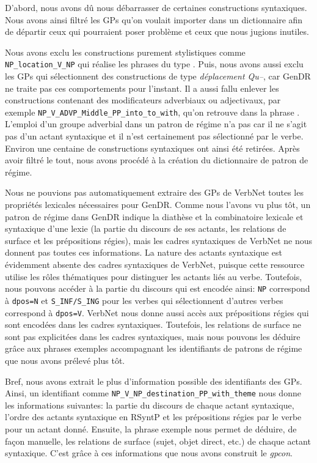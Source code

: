 D'abord, nous avons dû nous débarrasser de certaines constructions syntaxiques. Nous avons ainsi filtré les \acp{GP} qu'on voulait importer dans un dictionnaire afin de départir ceux qui pourraient poser problème et ceux que nous jugions inutiles.

Nous avons exclu les constructions purement stylistiques comme \lstinline|NP_location_V_NP| qui réalise les phrases du type . Puis, nous avons aussi exclu les \acp{GP} qui sélectionnent des constructions de type \emph{déplacement Qu--}, car GenDR ne traite pas ces comportements pour l'instant. Il a aussi fallu enlever les constructions contenant des modificateurs adverbiaux ou adjectivaux, par exemple \lstinline|NP_V_ADVP_Middle_PP_into_to_with|, qu'on retrouve dans la phrase . L'emploi d'un groupe adverbial dans un patron de régime n'a pas car il ne s'agit pas d'un actant syntaxique et il n'est certainement pas sélectionné par le verbe. Environ une centaine de constructions syntaxiques ont ainsi été retirées. Après avoir filtré le tout, nous avons procédé à la création du dictionnaire de patron de régime.

Nous ne pouvions pas automatiquement extraire des \acp{GP} de VerbNet toutes les propriétés lexicales nécessaires pour GenDR. Comme nous l'avons vu plus tôt, un patron de régime dans GenDR indique la diathèse et la combinatoire lexicale et syntaxique d'une lexie (la partie du discours de ses actants, les relations de surface et les prépositions régies), mais les cadres syntaxiques de VerbNet ne nous donnent pas toutes ces informations. La nature des actants syntaxique est évidemment absente des cadres syntaxiques de VerbNet, puisque cette ressource utilise les rôles thématiques pour distinguer les actants liés au verbe. Toutefois, nous pouvons accéder à la partie du discours qui est encodée ainsi: \texttt{NP} correspond à \texttt{dpos=N} et \texttt{S\_INF/S\_ING} pour les verbes qui sélectionnent d'autres verbes correspond à \texttt{dpos=V}. VerbNet nous donne aussi accès aux prépositions régies qui sont encodées dans les cadres syntaxiques. Toutefois, les relations de surface ne sont pas explicitées dans les cadres syntaxiques, mais nous pouvons les déduire grâce aux phrases exemples accompagnant les identifiants de patrons de régime que nous avons prélevé plus tôt.

Bref, nous avons extrait le plus d'information possible des identifiants des \acp{GP}. Ainsi, un identifiant comme \texttt{NP\_V\_NP\_destination\_PP\_with\_theme} nous donne les informations suivantes: la partie du discours de chaque actant syntaxique, l'ordre des actants syntaxique en \ac{RSyntP} et les prépositions régies par le verbe pour un actant donné. Ensuite, la phrase exemple  nous permet de déduire, de façon manuelle, les relations de surface (sujet, objet direct, etc.) de chaque actant syntaxique. C'est grâce à ces informations que nous avons construit le \emph{gpcon}.


